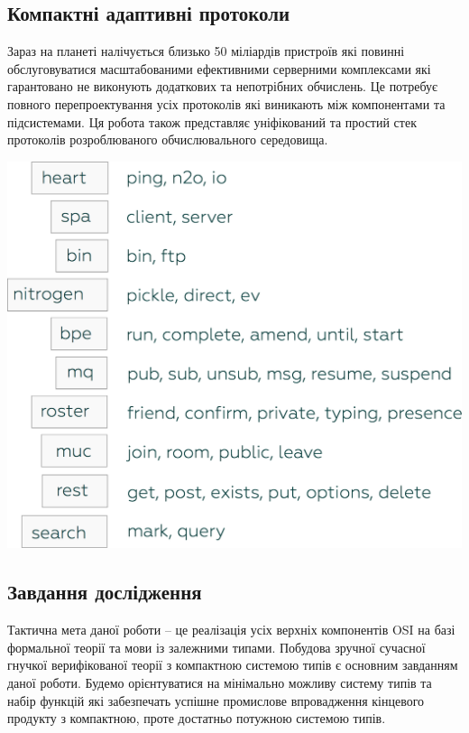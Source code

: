\documentclass[11pt,oneside]{article}
\begin{document}
\subsection{Компактні адаптивні протоколи}

   Зараз на планеті налічується близько 50 міліардів пристроїв які повинні обслуговуватися
   масштабованими ефективними серверними комплексами які гарантовано не виконують
   додаткових та непотрібних обчислень. Це потребує повного перепроектування усіх протоколів
   які виникають між компонентами та підсистемами. Ця робота також представляє
   уніфікований та простий стек протоколів розроблюваного обчислювального середовища.

   \begin{center}
   \vspace{0.5cm}
   \includegraphics[scale=0.15]{img/protocols}
   \end{center}

\newpage

\subsection{Завдання дослідження}
\vspace{0.5cm}

   Тактична мета даної роботи -- це реалізація усіх верхніх компонентів OSI на базі
   формальної теорії та мови із залежними типами. Побудова зручної сучасної гнучкої верифікованої теорії
   з компактною системою типів є основним завданням даної роботи. Будемо орієнтуватися
   на мінімально можливу систему типів та набір функцій які забезпечать успішне промислове
   впровадження кінцевого продукту з компактною, проте достатньо потужною системою типів.
\end{document}
